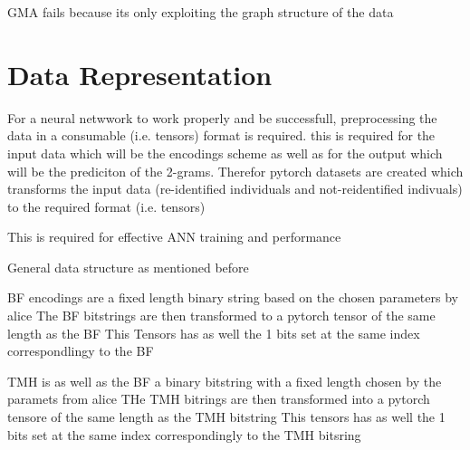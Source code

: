 GMA fails because its only exploiting the graph structure of the data

\section{Data Representation} \label{sec:representation}

For a neural netwwork to work properly and be successfull, preprocessing the data in a consumable (i.e. tensors) format is required. this is required for the input data which will be the encodings scheme as well as for the output which will be the prediciton of the 2-grams. Therefor pytorch datasets are created which transforms the input data (re-identified individuals and not-reidentified indivuals) to the required format (i.e. tensors)

This is required for effective ANN training and performance

General data structure as mentioned before

BF encodings are a fixed length binary string based on the chosen parameters by alice
The BF bitstrings are then transformed to a pytorch tensor of the same length as the BF
This Tensors has as well the 1 bits set at the same index correspondlingy to the BF

TMH is as well as the BF a binary bitstring with a fixed length chosen by the paramets from alice
THe TMH bitrings are then transformed into a pytorch tensore of the same length as the TMH bitstring
This tensors has as well the 1 bits set at the same index correspondingly to the TMH bitsring

